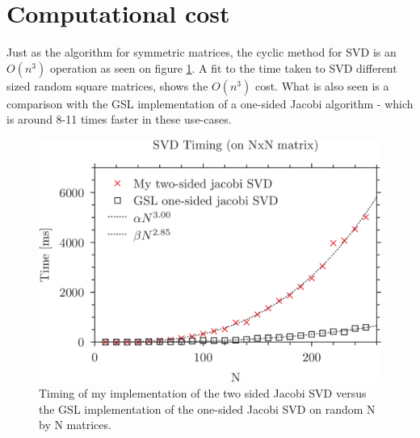 \documentclass{article}
\begin{document}
    \section{Computational cost}
    Just as the algorithm for symmetric matrices, the cyclic method for SVD is an $ O(n^3) $ operation as seen on figure \ref{fig:timing}. A fit to the time taken to SVD different sized random square matrices, shows the $ O(n^3) $ cost.
    What is also seen is a comparison with the GSL implementation of a one-sided Jacobi algorithm - which is around 8-11 times faster in these use-cases.
    \begin{figure}
    	\includegraphics{timing.png}
    	\caption{Timing of my implementation of the two sided Jacobi SVD versus the GSL implementation of the one-sided Jacobi SVD on random N by N matrices.}
    	\label{fig:timing}
    \end{figure}
    
    
    
\end{document}
